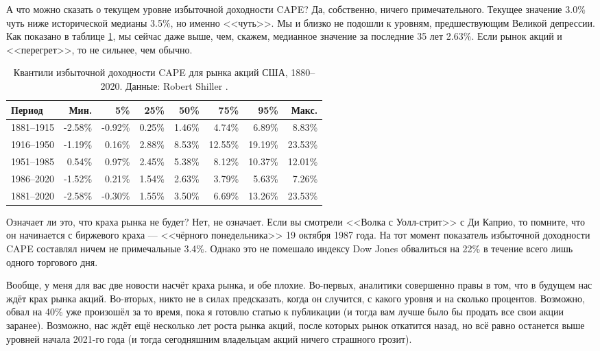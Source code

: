 А что можно сказать о текущем уровне избыточной доходности CAPE? Да, собственно, ничего примечательного. Текущее значение 3.0\% чуть ниже исторической медианы 3.5\%, но именно <<чуть>>. Мы и близко не подошли к уровням, предшествующим Великой депрессии. Как показано в таблице \ref{cape_excess_yield_quantiles_table}, мы сейчас даже выше, чем, скажем, медианное значение за последние 35 лет 2.63\%. Если рынок акций и <<перегрет>>, то не сильнее, чем обычно.

\begin{table}[ht]
\centering
\begin{tabular}{l|r|r|r|r|r|r|r}
Период       & Мин.      & 5\%       & 25\%   & 50\%    & 75\%      & 95\% & Макс. \\ \hline
1881--1915 & -2.58\% & -0.92\% & 0.25\% & 1.46\% &   4.74\% & 6.89\%  & 8.83\% \\
1916--1950 & -1.19\% &  0.16\% & 2.88\% & 8.53\% & 12.55\%  & 19.19\% & 23.53\% \\
1951--1985 &  0.54\% &  0.97\% & 2.45\% & 5.38\% &   8.12\%  & 10.37\% & 12.01\% \\
1986--2020 & -1.52\% &  0.21\% & 1.54\% & 2.63\% &   3.79\%  & 5.63\%  & 7.26\% \\ \hline
1881--2020 & -2.58\% & -0.30\% & 1.55\% & 3.50\% &   6.69\%  & 13.26\% & 23.53\%
\end{tabular}
\caption{Квантили избыточной доходности CAPE для рынка акций США, 1880--2020. Данные: Robert Shiller \cite{shillerOnline}.}
\label{cape_excess_yield_quantiles_table}
\end{table}

Означает ли это, что краха рынка не будет? Нет, не означает. Если вы смотрели <<Волка с Уолл-стрит>> с Ди Каприо, то помните, что он начинается с биржевого краха --- <<чёрного понедельника>> 19 октября 1987 года. На тот момент показатель избыточной доходности CAPE составлял ничем не примечальные 3.4\%. Однако это не помешало индексу Dow Jones обвалиться на 22\% в течение всего лишь одного торгового дня. 

Вообще, у меня для вас две новости насчёт краха рынка, и обе плохие. Во-первых, аналитики совершенно правы в том, что в будущем нас ждёт крах рынка акций. Во-вторых, никто не в силах предсказать, когда он случится, с какого уровня и на сколько процентов. Возможно, обвал на 40\% уже произошёл за то время, пока я готовлю статью к публикации (и тогда вам лучше было бы продать все свои акции заранее). Возможно, нас ждёт ещё несколько лет роста рынка акций, после которых рынок откатится назад, но всё равно останется выше уровней начала 2021-го года (и тогда сегодняшним владельцам акций ничего страшного грозит).

